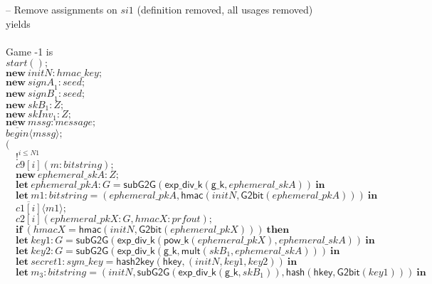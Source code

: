 \documentclass{article}
\newcommand{\cinput}[2]{{#1}({#2})}
\newcommand{\coutput}[2]{\overline{#1}\langle{#2}\rangle}
\newcommand{\kw}[1]{\mathbf{#1}}
\newcommand{\kwf}[1]{\mathsf{#1}}
\newcommand{\var}[1]{\mathit{#1}}
\newcommand{\kwt}[1]{\mathit{#1}}
\newcommand{\kwp}[1]{\mathit{#1}}
\newcommand{\kwc}[1]{\mathit{#1}}
\begin{document}
\begin{tabbing}
\quad -- Remove assignments on $\var{si1}$ (definition removed, all usages removed)\\
yields\\
\\
Game -1 is\\
\>$\cinput{\kwc{start}}{};$\\
\>$\kw{new}\ \var{initN}: \kwt{hmac{\_}key};$\\
\>$\kw{new}\ \var{signA}_{1}: \kwt{seed};$\\
\>$\kw{new}\ \var{signB}_{1}: \kwt{seed};$\\
\>$\kw{new}\ \var{skB}_{1}: \kwt{Z};$\\
\>$\kw{new}\ \var{skInv}_{1}: \kwt{Z};$\\
\>$\kw{new}\ \var{mssg}: \kwt{message};$\\
\>$\coutput{\kwc{begin}}{\var{mssg}};$\\
\>$($\\
\>$\quad !^{\var{i} \leq \kwp{N1}}$\\
\>$\quad \cinput{\kwc{c9}[\var{i}]}{\var{m}: \kwt{bitstring}};$\\
\>$\quad \kw{new}\ \var{ephemeral{\_}skA}: \kwt{Z};$\\
\>$\quad \kw{let}\ \var{ephemeral{\_}pkA}: \kwt{G} = \kwf{subG2G}(\kwf{exp{\_}div{\_}k}(\kwf{g{\_}k}, \var{ephemeral{\_}skA}))\ \kw{in}$\\
\>$\quad \kw{let}\ \var{m1}: \kwt{bitstring} = \kwf{}(\var{ephemeral{\_}pkA}, \kwf{hmac}(\var{initN}, \kwf{G2bit}(\var{ephemeral{\_}pkA})))\ \kw{in}$\\
\>$\quad \coutput{\kwc{c1}[\var{i}]}{\var{m1}};$\\
\>$\quad \cinput{\kwc{c2}[\var{i}]}{\var{ephemeral{\_}pkX}: \kwt{G}, \var{hmacX}: \kwt{prfout}};$\\
\>$\quad \kw{if}\ (\var{hmacX}  =  \kwf{hmac}(\var{initN}, \kwf{G2bit}(\var{ephemeral{\_}pkX})))\ \kw{then}$\\
\>$\quad \kw{let}\ \var{key1}: \kwt{G} = \kwf{subG2G}(\kwf{exp{\_}div{\_}k}(\kwf{pow{\_}k}(\var{ephemeral{\_}pkX}), \var{ephemeral{\_}skA}))\ \kw{in}$\\
\>$\quad \kw{let}\ \var{key2}: \kwt{G} = \kwf{subG2G}(\kwf{exp{\_}div{\_}k}(\kwf{g{\_}k}, \kwf{mult}(\var{skB}_{1}, \var{ephemeral{\_}skA})))\ \kw{in}$\\
\>$\quad \kw{let}\ \var{secret1}: \kwt{sym{\_}key} = \kwf{hash2key}(\kwf{hkey}, \kwf{}(\var{initN}, \var{key1}, \var{key2}))\ \kw{in}$\\
\>$\quad \kw{let}\ \var{m}_{3}: \kwt{bitstring} = \kwf{}(\var{initN}, \kwf{subG2G}(\kwf{exp{\_}div{\_}k}(\kwf{g{\_}k}, \var{skB}_{1})), \kwf{hash}(\kwf{hkey}, \kwf{G2bit}(\var{key1})))\ \kw{in}$\\

\end{tabbing}
\end{document}
